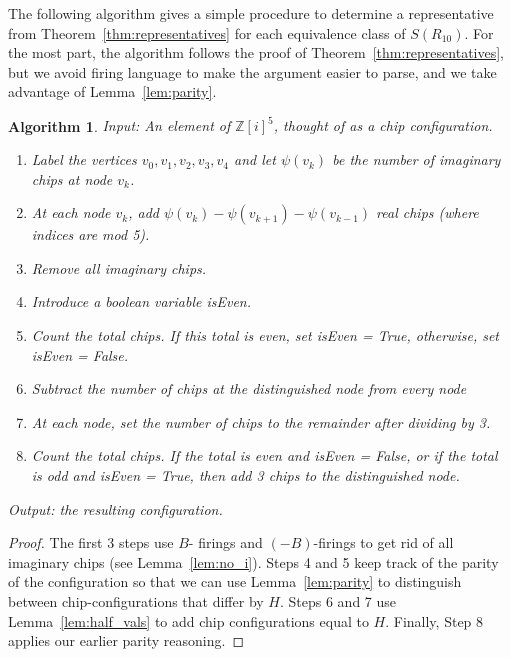 \documentclass[12p]{amsart}
\numberwithin{equation}{section}
\theoremstyle{plain}
\newtheorem{alg}[thm]{Algorithm}
\theoremstyle{definition}
\newcommand{\Z}{\mathbb {Z}}
\begin{document}
The following algorithm gives a simple procedure to determine a representative from Theorem~\ref{thm:representatives} for each equivalence class of $S(R_{10})$. For the most part, the algorithm follows the proof of Theorem~\ref{thm:representatives}, but we avoid firing language to make the argument easier to parse, and we take advantage of Lemma~\ref{lem:parity}. 

\begin{alg}\label{alg:stabilize}
    Input: An element of $\Z[i]^5$, thought of as a chip configuration.
    \begin{enumerate}[1.]
        \item Label the vertices $v_0,v_1,v_2,v_3,v_4$ and let $\psi(v_k)$ be the number of imaginary chips at node $v_k$. 
        \item At each node $v_k$, add $\psi(v_{k}) - \psi(v_{k+1}) - \psi(v_{k-1})$ real chips (where indices are mod 5). 
        \item Remove all imaginary chips. 
        \item Introduce a boolean variable isEven.
        \item Count the total chips. If this total is even, set isEven = True, otherwise, set isEven = False. 
        \item Subtract the number of chips at the distinguished node from every node
        \item At each node, set the number of chips to the remainder after dividing by 3. 
        \item Count the total chips. If the total is even and isEven = False, or if the total is odd and isEven = True, then add 3 chips to the distinguished node. 
    \end{enumerate}    
    Output: the resulting configuration.
\end{alg}
\begin{proof}
The first 3 steps use $B$- firings and $(-B)$-firings to get rid of all imaginary chips (see Lemma~\ref{lem:no_i}). Steps 4 and 5 keep track of the parity of the configuration so that we can use Lemma~\ref{lem:parity} to distinguish between chip-configurations that differ by $H$. Steps 6 and 7 use Lemma~\ref{lem:half_vals} to add chip configurations equal to $H$. Finally, Step 8 applies our earlier parity reasoning. 
\end{proof}
\end{document}
